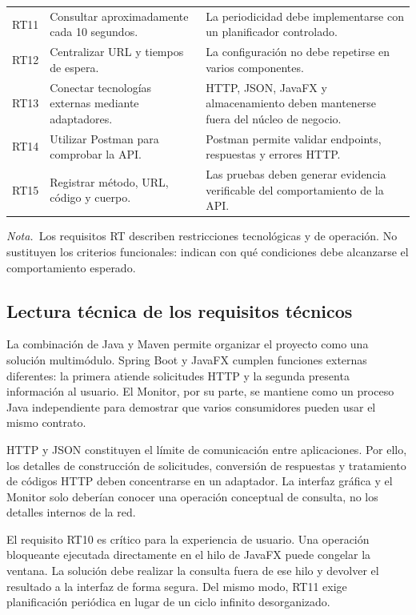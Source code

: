 \documentclass[12pt,letterpaper]{article}
\newcommand{\tablaNota}[1]{\par\smallskip\noindent\textit{Nota.}~#1}
\begin{document}
\begin{table}[!ht]
\begin{tabularx}{\textwidth}{@{}P{1.25cm}P{4.05cm}Y@{}}
RT11 & Consultar aproximadamente cada 10 segundos. & La periodicidad debe implementarse con un planificador controlado.\\
RT12 & Centralizar URL y tiempos de espera. & La configuración no debe repetirse en varios componentes.\\
RT13 & Conectar tecnologías externas mediante adaptadores. & HTTP, JSON, JavaFX y almacenamiento deben mantenerse fuera del núcleo de negocio.\\
RT14 & Utilizar Postman para comprobar la API. & Postman permite validar endpoints, respuestas y errores HTTP.\\
RT15 & Registrar método, URL, código y cuerpo. & Las pruebas deben generar evidencia verificable del comportamiento de la API.\\
\bottomrule
\end{tabularx}
\tablaNota{Los requisitos RT describen restricciones tecnológicas y de operación. No sustituyen los criterios funcionales: indican con qué condiciones debe alcanzarse el comportamiento esperado.}
\end{table}

\subsection{Lectura técnica de los requisitos técnicos}
La combinación de Java y Maven permite organizar el proyecto como una solución multimódulo. Spring Boot y JavaFX cumplen funciones externas diferentes: la primera atiende solicitudes HTTP y la segunda presenta información al usuario. El Monitor, por su parte, se mantiene como un proceso Java independiente para demostrar que varios consumidores pueden usar el mismo contrato.

HTTP y JSON constituyen el límite de comunicación entre aplicaciones. Por ello, los detalles de construcción de solicitudes, conversión de respuestas y tratamiento de códigos HTTP deben concentrarse en un adaptador. La interfaz gráfica y el Monitor solo deberían conocer una operación conceptual de consulta, no los detalles internos de la red.

El requisito RT10 es crítico para la experiencia de usuario. Una operación bloqueante ejecutada directamente en el hilo de JavaFX puede congelar la ventana. La solución debe realizar la consulta fuera de ese hilo y devolver el resultado a la interfaz de forma segura. Del mismo modo, RT11 exige planificación periódica en lugar de un ciclo infinito desorganizado.
\end{document}
